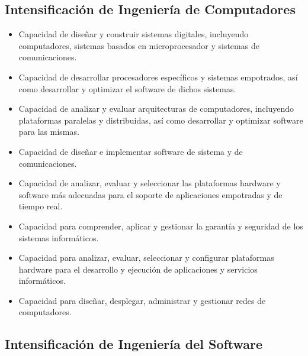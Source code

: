 \documentclass{pre-tfg}
\begin{document}
\subsection*{Intensificación de Ingeniería de Computadores}

\begin{itemize}
\item Capacidad de diseñar y construir sistemas digitales, incluyendo computadores,
  sistemas basados en microprocesador y sistemas de comunicaciones.
\item Capacidad de desarrollar procesadores específicos y sistemas empotrados, así como
  desarrollar y optimizar el software de dichos sistemas.
\item Capacidad de analizar y evaluar arquitecturas de computadores, incluyendo
  plataformas paralelas y distribuidas, así como desarrollar y optimizar software para las
  mismas.
\item Capacidad de diseñar e implementar software de sistema y de comunicaciones.
\item Capacidad de analizar, evaluar y seleccionar las plataformas hardware y software más
  adecuadas para el soporte de aplicaciones empotradas y de tiempo real.
\item Capacidad para comprender, aplicar y gestionar la garantía y seguridad de los sistemas informáticos.
\item Capacidad para analizar, evaluar, seleccionar y configurar plataformas hardware para
  el desarrollo y ejecución de aplicaciones y servicios informáticos.
\item Capacidad para diseñar, desplegar, administrar y gestionar redes de computadores.
\end{itemize}


\subsection*{Intensificación de Ingeniería del Software}
\end{document}
